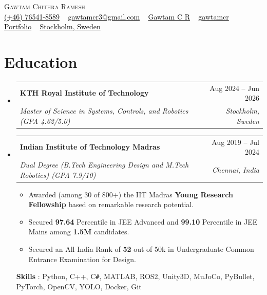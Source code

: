 \documentclass[letterpaper, 11pt]{article}
\makeatletter
\newcommand{\resumeSubheading}[4]{
\vspace{-2pt}
\item
\begin{tabular*}{1.0\textwidth}[t]{l@{\extracolsep{\fill}}r}
	\textbf{#1}       & {\small #2} \\
     [-2pt]
	\textit{{\small#3}} & \textit{\small #4} \\
\end{tabular*}
\vspace{-10pt}
}
\newcommand{\resumeSubHeadingListStart}{\begin{itemize}[leftmargin=0.0in, label={}]}
\newcommand{\resumeSubHeadingListEnd}{\end{itemize}\vspace{-1em}}
\makeatother
\begin{document}
\begin{center}
    {\Huge \scshape Gawtam Chithra Ramesh} \\
    \vspace{3pt}
    \small
    { \href{tel:+46764518589}{{\faMobile*} \textcolor{black}{(+46) 76541-8589}} ~
    \href{mailto:gawtamcr3@gmail.com}{{\faPaperPlane} \textcolor{black}{gawtamcr3@gmail.com}} ~
    \href{https://linkedin.com/in/gawtamcr/}{{\faLinkedinIn} \textcolor{black}{Gawtam C R}} ~
    \href{https://github.com/gawtamcr}{{\faGithub} \textcolor{black}{gawtamcr}} ~
    \href{https://gawtamcr.github.io/}{{\faGlobe} \textcolor{black}{Portfolio}} ~
    \href{https://maps.google.com/?q=Stockholm,Sweden}{{\faMapMarker*} \textcolor{black}{Stockholm, Sweden}}
    }
    \vspace{-8pt}
\end{center}

\section{\color{Blue}Education}
    \resumeSubHeadingListStart
    \resumeSubheading{KTH Royal Institute of Technology}{Aug 2024 -- Jun 2026}{Master of Science in Systems, Controls, and Robotics \textnormal{(GPA 4.62/5.0)}}{Stockholm, Sweden}
    \resumeSubheading{Indian Institute of Technology Madras}{Aug 2019 -- Jul 2024}{Dual Degree (B.Tech Engineering Design and M.Tech Robotics) \textnormal{(GPA 7.9/10)}}{Chennai, India}
    \vspace{-0.3em}
    \small{
    \begin{itemize}[leftmargin=0.15in]
        \setlength{\itemsep}{-0.3em}
        \item Awarded (among 30 of 800+) the IIT Madras \textbf{Young Research Fellowship} based on remarkable research potential.
        \item Secured \textbf{97.64} Percentile in JEE Advanced and \textbf{99.10} Percentile in JEE Mains among \textbf{1.5M} candidates.
        \item Secured an All India Rank of \textbf{52} out of 50k in Undergraduate Common Entrance Examination for Design.
    \end{itemize}
    }
    \vspace{-0.7em}
    \textbf{Skills} : Python, C++, C\texttt{\#}, MATLAB, ROS2, Unity3D, MuJoCo, PyBullet, PyTorch, OpenCV, YOLO, Docker, Git
    \resumeSubHeadingListEnd

\end{document}

